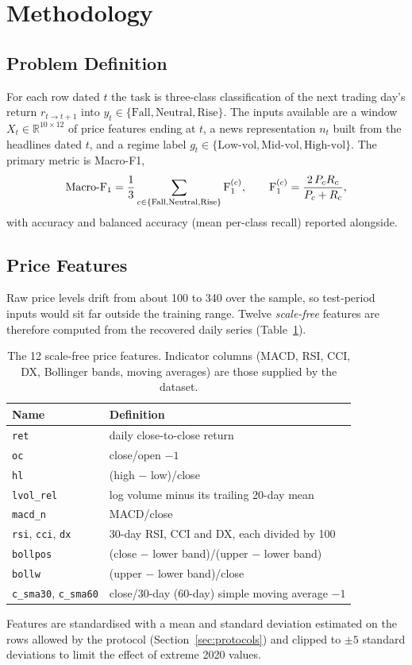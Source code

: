 \newpage
\section{Methodology}\label{ch:method}
\subsection{Problem Definition}
For each row dated $t$ the task is three-class classification of the next trading day's return $r_{t\to t+1}$ into $y_t\in\{\text{Fall},\text{Neutral},\text{Rise}\}$. The inputs available are a window $X_t\in\mathbb{R}^{10\times12}$ of price features ending at $t$, a news representation $n_t$ built from the headlines dated $t$, and a regime label $g_t\in\{\text{Low-vol},\text{Mid-vol},\text{High-vol}\}$. The primary metric is Macro-F1,
\[
\mathrm{Macro\text{-}}\mathrm{F}_1=\frac13\sum_{c\in\{\text{Fall},\text{Neutral},\text{Rise}\}}\mathrm{F}_1^{(c)},\qquad
\mathrm{F}_1^{(c)}=\frac{2\,P_cR_c}{P_c+R_c},
\]
with accuracy and balanced accuracy (mean per-class recall) reported alongside.

\subsection{Price Features}
Raw price levels drift from about 100 to 340 over the sample, so test-period inputs would sit far outside the training range. Twelve \emph{scale-free} features are therefore computed from the recovered daily series (Table~\ref{tab:features}).
\begin{table}[H]
\centering
\begin{tabular}{ll}
\toprule
Name & Definition\\
\midrule
\texttt{ret} & daily close-to-close return\\
\texttt{oc} & close/open $-1$\\
\texttt{hl} & (high $-$ low)/close\\
\texttt{lvol\_rel} & log volume minus its trailing 20-day mean\\
\texttt{macd\_n} & MACD/close\\
\texttt{rsi}, \texttt{cci}, \texttt{dx} & 30-day RSI, CCI and DX, each divided by 100\\
\texttt{bollpos} & (close $-$ lower band)/(upper $-$ lower band)\\
\texttt{bollw} & (upper $-$ lower band)/close\\
\texttt{c\_sma30}, \texttt{c\_sma60} & close/30-day (60-day) simple moving average $-1$\\
\bottomrule
\end{tabular}
\caption[The 12 scale-free price features]{The 12 scale-free price features. Indicator columns (MACD, RSI, CCI, DX, Bollinger bands, moving averages) are those supplied by the dataset.}\label{tab:features}
\end{table}
Features are standardised with a mean and standard deviation estimated on the rows allowed by the protocol (Section~\ref{sec:protocols}) and clipped to $\pm5$ standard deviations to limit the effect of extreme 2020 values.

